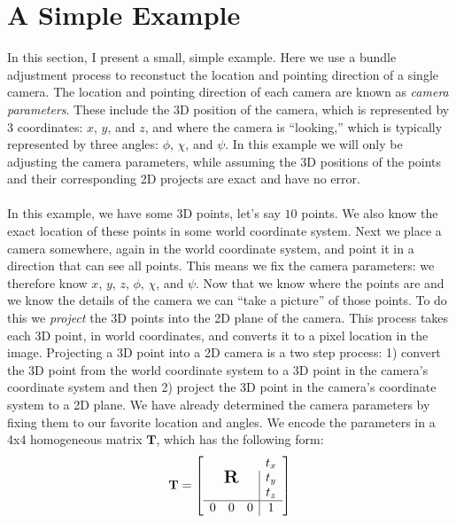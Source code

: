\documentclass{article}
\begin{document}
\section{A Simple Example}
\label{sec:simple-example}
In this section, I present a small, simple example.  Here we use a
bundle adjustment process to reconstuct the location and pointing
direction of a single camera.  The location and pointing direction of
each camera are known as \textit{camera parameters}.  These include
the 3D position of the camera, which is represented by 3 coordinates:
$x$, $y$, and $z$, and where the camera is ``looking,'' which is
typically represented by three angles: $\phi$, $\chi$, and $\psi$.  In
this example we will only be adjusting the camera parameters, while
assuming the 3D positions of the points and their corresponding 2D
projects are exact and have no error.
\\
\\
In this example, we have some 3D points, let's say $10$ points.  We
also know the exact location of these points in some world coordinate
system.  Next we place a camera somewhere, again in the world
coordinate system, and point it in a direction that can see all
points.  This means we fix the camera parameters: we therefore know
$x$, $y$, $z$, $\phi$, $\chi$, and $\psi$.  Now that we know where the
points are and we know the details of the camera we can ``take a
picture'' of those points.  To do this we \emph{project} the 3D points
into the 2D plane of the camera.  This process takes each 3D point, in
world coordinates, and converts it to a pixel location in the image.
Projecting a 3D point into a 2D camera is a two step process: 1)
convert the 3D point from the world coordinate system to a 3D point in
the camera's coordinate system and then 2) project the 3D point in the
camera's coordinate system to a 2D plane.  We have already determined
the camera parameters by fixing them to our favorite location and
angles.  We encode the parameters in a 4x4 homogeneous matrix
$\mathbf{T}$, which has the following form:
\\
\begin{equation}
  \label{eq:T-matrix}
  \mathbf{T} = \left[
  \begin{array}{ccc|c}
      \multicolumn{3}{c}{\multirow{3}{*}{\Large $\mathbf{R}$}} & t_x \\
      & & & t_y \\
      & & & t_z \\ \hline
      0 & 0 & 0 & 1
  \end{array}
  \right]
\end{equation}
\end{document}
